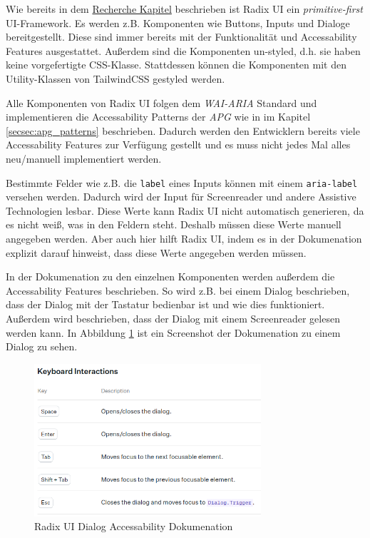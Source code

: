 Wie bereits in dem \hyperref[secsec:radix]{Recherche Kapitel} beschrieben ist Radix UI ein \emph{primitive-first} UI-Framework. Es werden z.B. Komponenten wie Buttons, Inputs und Dialoge bereitgestellt. Diese sind immer bereits mit der Funktionalität und Accessability Features ausgestattet. Außerdem sind die Komponenten un-styled, d.h. sie haben keine vorgefertigte CSS-Klasse. Stattdessen können die Komponenten mit den Utility-Klassen von TailwindCSS gestyled werden.

Alle Komponenten von Radix UI folgen dem \emph{WAI-ARIA} Standard und implementieren die Accessability Patterns der \emph{APG} wie in im Kapitel \ref{secsec:apg_patterns} beschrieben. Dadurch werden den Entwicklern bereits viele Accessability Features zur Verfügung gestellt und es muss nicht jedes Mal alles neu/manuell implementiert werden.

Bestimmte Felder wie z.B. die \texttt{label} eines Inputs können mit einem \texttt{aria-label} versehen werden. Dadurch wird der Input für Screenreader und andere Assistive Technologien lesbar. Diese Werte kann Radix UI nicht automatisch generieren, da es nicht weiß, was in den Feldern steht. Deshalb müssen diese Werte manuell angegeben werden. Aber auch hier hilft Radix UI, indem es in der Dokumenation explizit darauf hinweist, dass diese Werte angegeben werden müssen.

In der Dokumenation zu den einzelnen Komponenten werden außerdem die Accessability Features beschrieben. So wird z.B. bei einem Dialog beschrieben, dass der Dialog mit der Tastatur bedienbar ist und wie dies funktioniert. Außerdem wird beschrieben, dass der Dialog mit einem Screenreader gelesen werden kann. In Abbildung \ref{fig:radix_dialog_keyboard} ist ein Screenshot der Dokumenation zu einem Dialog zu sehen.

\begin{figure}[th]
\centering
\includegraphics[width=0.75\textwidth]{Figures/radix_dialog_keyboard.png}
\decoRule
\caption[Dialog Accessability Dokumenation]{Radix UI Dialog Accessability Dokumenation}
\label{fig:radix_dialog_keyboard}
\end{figure}

